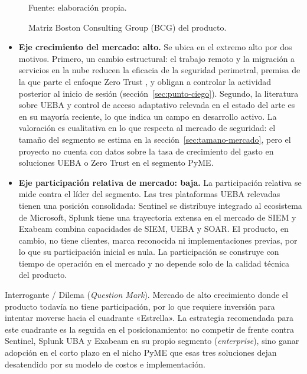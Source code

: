 \begin{figure}[h]
	\centering
	
	\caption{Matriz Boston Consulting Group (BCG) del producto.}
	\label{fig:matriz-bcg}
	{\small Fuente: elaboración propia.\par}
\end{figure}
\FloatBarrier

\begin{itemize}
	\item \textbf{Eje crecimiento del mercado: alto.} Se ubica en el extremo alto por dos motivos. Primero, un cambio estructural: el trabajo remoto y la migración a servicios en la nube reducen la eficacia de la seguridad perimetral, premisa de la que parte el enfoque Zero Trust \parencite{Rose2020}, y obligan a controlar la actividad posterior al inicio de sesión (sección~\ref{sec:punto-ciego}). Segundo, la literatura sobre UEBA y control de acceso adaptativo relevada en el estado del arte es en su mayoría reciente, lo que indica un campo en desarrollo activo. La valoración es cualitativa en lo que respecta al mercado de seguridad: el tamaño del segmento se estima en la sección~\ref{sec:tamano-mercado}, pero el proyecto no cuenta con datos sobre la tasa de crecimiento del gasto en soluciones UEBA o Zero Trust en el segmento PyME.
	\item \textbf{Eje participación relativa de mercado: baja.} La participación relativa se mide contra el líder del segmento. Las tres plataformas UEBA relevadas tienen una posición consolidada: Sentinel se distribuye integrado al ecosistema de Microsoft, Splunk tiene una trayectoria extensa en el mercado de SIEM y Exabeam combina capacidades de SIEM, UEBA y SOAR. El producto, en cambio, no tiene clientes, marca reconocida ni implementaciones previas, por lo que su participación inicial es nula. La participación se construye con tiempo de operación en el mercado y no depende solo de la calidad técnica del producto.
\end{itemize}

Interrogante / Dilema (\emph{Question Mark}). Mercado de alto crecimiento donde el producto todavía no tiene participación, por lo que requiere inversión para intentar moverse hacia el cuadrante «Estrella». La estrategia recomendada para este cuadrante es la seguida en el posicionamiento: no competir de frente contra Sentinel, Splunk UBA y Exabeam en su propio segmento (\emph{enterprise}), sino ganar adopción en el corto plazo en el nicho PyME que esas tres soluciones dejan desatendido por su modelo de costos e implementación.

\clearpage

